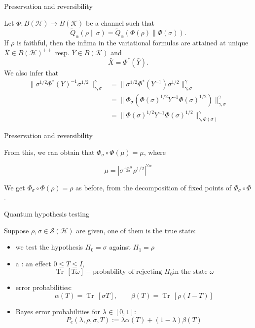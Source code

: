 \documentclass[mathserif]{beamer}
\newcommand{\<}{\langle}
\renewcommand{\>}{\rangle}
\newcommand{\Tr}{\operatorname{Tr}\,}
\newcommand{\Se}{\mathcal S}
\newcommand{\Ha}{\mathcal H}
\newcommand{\Ka}{\mathcal K}
\begin{document}
\begin{frame}{Preservation and reversibility}

Let $\Phi: B(\Ha)\to B(\Ka)$ be a channel such that
\[
\tilde Q_\alpha(\rho\|\sigma)= \tilde Q_\alpha(\Phi(\rho)\|\Phi(\sigma)).
\]
If $\rho$ is faithful, then the infima in the variational formulas are
attained at unique  $\bar X\in B(\Ha)^{++}$ resp.  $\bar Y\in B(\Ka)$ and 
\[
\bar X=\Phi^*(\bar Y).
\]
We also infer that
\begin{align*}
\|\sigma^{1/2}\Phi^*(Y)^{-1}\sigma^{1/2}\|_{\gamma,\sigma}^\gamma&=
\|\sigma^{1/2}\Phi^*(Y^{-1})\sigma^{1/2}\|^\gamma_{\gamma,\sigma}\\ &=
\|\Phi_\sigma(\Phi(\sigma)^{1/2}Y^{-1}\Phi(\sigma)^{1/2})\|^\gamma_{\gamma,\sigma}\\
&= \|\Phi(\sigma)^{1/2}Y^{-1}\Phi(\sigma)^{1/2}\|^\gamma_{\gamma,\Phi(\sigma)}
\end{align*}




\end{frame}


\begin{frame}{Preservation and reversibility}

From this, we can obtain that $\Phi_\sigma\circ\Phi(\mu)=\mu$, where

\[
\mu=|\sigma^{\frac{1-\alpha}{2\alpha}}\rho^{1/2}|^{2\alpha}
\]

We get $\Phi_\sigma\circ\Phi(\rho)=\rho$ as before, from the decomposition of fixed points
of $\Phi_\sigma\circ\Phi$.




\end{frame}






\begin{frame}{Quantum hypothesis testing}

Suppose $\rho,\sigma\in \Se(\Ha)$ are given, one of them is the true state:


\bigskip

\begin{itemize}
\item we test the hypothesis $H_0=\sigma$ against $H_1=\rho$
\item a : an effect $0\le T\le I$, 
\[
\Tr[T\omega] - \text{probability of rejecting $H_0$
in the state $\omega$}
\]
\item error probabilities: 
\[
\alpha(T)=\Tr[\sigma T],\qquad \beta(T)= \Tr[\rho(I-T)]
\]
\item  Bayes error probabilities for $\lambda\in [0,1]$: 
\[
P_e(\lambda,\rho,\sigma,T):=\lambda\alpha(T)+(1-\lambda)\beta(T)
\]
\end{itemize}


\end{frame}
\end{document}
